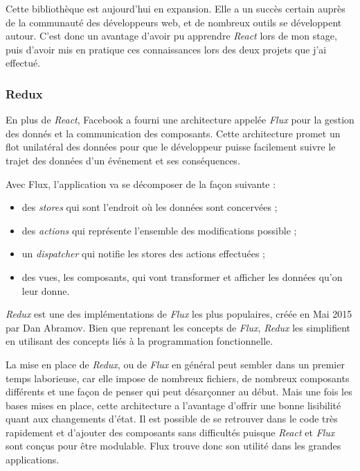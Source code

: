 \documentclass[12pt,a4paper]{article}
\providecommand{\tightlist}{%
  \setlength{\itemsep}{0pt}\setlength{\parskip}{0pt}}
\begin{document}
  \bigskip

  Cette bibliothèque est aujourd'hui en expansion. Elle a un succès
  certain auprès de la communauté des développeurs web, et de nombreux
  outils se développent autour. C'est donc un avantage d'avoir pu
  apprendre \emph{React} lors de mon stage, puis d'avoir mis en pratique
  ces connaissances lors des deux projets que j'ai effectué.

  \bigskip

  \subsubsection{Redux}\label{redux}

  \bigskip

  En plus de \emph{React}, Facebook a fourni une architecture appelée
  \emph{Flux} pour la gestion des donnés et la communication des
  composants. Cette architecture promet un flot unilatéral des données
  pour que le développeur puisse facilement suivre le trajet des données
  d'un événement et ses conséquences.

  \bigskip

  Avec Flux, l'application va se décomposer de la façon suivante :

  \begin{itemize}
  \tightlist
  \item
    des \emph{stores} qui sont l'endroit où les données sont concervées ;
  \item
    des \emph{actions} qui représente l'ensemble des modifications
    possible ;
  \item
    un \emph{dispatcher} qui notifie les stores des actions effectuées ;
  \item
    des vues, les composants, qui vont transformer et afficher les données
    qu'on leur donne.
  \end{itemize}

  \bigskip

  \emph{Redux} est une des implémentations de \emph{Flux} les plus
  populaires, créée en Mai 2015 par Dan Abramov. Bien que reprenant les
  concepts de \emph{Flux}, \emph{Redux} les simplifient en utilisant des
  concepts liés à la programmation fonctionnelle.

  \bigskip

  La mise en place de \emph{Redux}, ou de \emph{Flux} en général peut
  sembler dans un premier temps laborieuse, car elle impose de nombreux
  fichiers, de nombreux composants différents et une façon de penser qui
  peut désarçonner au début. Mais une fois les bases mises en place, cette
  architecture a l'avantage d'offrir une bonne lisibilité quant aux
  changements d'état. Il est possible de se retrouver dans le code très
  rapidement et d'ajouter des composants sans difficultés puisque
  \emph{React} et \emph{Flux} sont conçus pour être modulable. Flux trouve
  donc son utilité dans les grandes applications.
\end{document}
